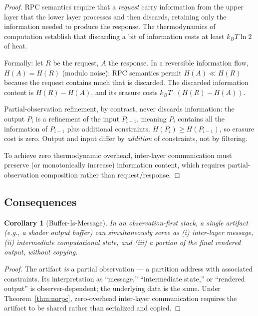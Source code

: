 \documentclass[11pt,twocolumn,a4paper]{article}
\newtheorem{corollary}[theorem]{Corollary}
\theoremstyle{definition}
\theoremstyle{remark}
\begin{document}
\begin{proof}
RPC semantics require that a \emph{request} carry information from the upper layer that the lower layer processes and then discards, retaining only the information needed to produce the response. The thermodynamics of computation \citep{landauer1961irreversibility, bennett1982thermodynamics} establish that discarding a bit of information costs at least $k_B T \ln 2$ of heat.

Formally: let $R$ be the request, $A$ the response. In a reversible information flow, $H(A) = H(R)$ (modulo noise); RPC semantics permit $H(A) \ll H(R)$ because the request contains much that is discarded. The discarded information content is $H(R) - H(A)$, and its erasure costs $k_B T \cdot (H(R) - H(A))$.

Partial-observation refinement, by contrast, never discards information: the output $P_i$ is a refinement of the input $P_{i-1}$, meaning $P_i$ contains all the information of $P_{i-1}$ plus additional constraints. $H(P_i) \geq H(P_{i-1})$, so erasure cost is zero. Output and input differ by \emph{addition} of constraints, not by filtering.

To achieve zero thermodynamic overhead, inter-layer communication must preserve (or monotonically increase) information content, which requires partial-observation composition rather than request/response.
\end{proof}

\subsection{Consequences}

\begin{corollary}[Buffer-Is-Message]
\label{cor:buffer}
In an observation-first stack, a single artifact (e.g., a shader output buffer) can simultaneously serve as (i) inter-layer message, (ii) intermediate computational state, and (iii) a portion of the final rendered output, without copying.
\end{corollary}

\begin{proof}
The artifact \emph{is} a partial observation --- a partition address with associated constraints. Its interpretation as ``message,'' ``intermediate state,'' or ``rendered output'' is observer-dependent; the underlying data is the same. Under Theorem~\ref{thm:norpc}, zero-overhead inter-layer communication requires the artifact to be shared rather than serialized and copied.
\end{proof}
\end{document}
